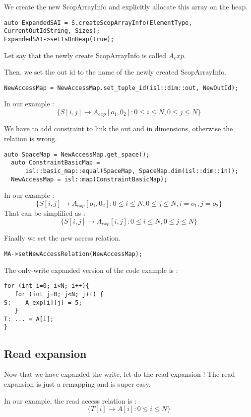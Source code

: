 We create the new ScopArrayInfo and explicitly allocate this array on the heap.

\begin{lstlisting}[frame=single]
auto ExpandedSAI = S.createScopArrayInfo(ElementType, CurrentOutIdString, Sizes);
ExpandedSAI->setIsOnHeap(true);
\end{lstlisting}
Let say that the newly create ScopArrayInfo is called $A_exp$.

Then, we set the out id to the name of the newly created ScopArrayInfo.
\begin{lstlisting}[frame=single]
NewAccessMap = NewAccessMap.set_tuple_id(isl::dim::out, NewOutId);
\end{lstlisting}
In our example :
\[
\{ S[i, j] \rightarrow A_{exp}[o_1, 0_2] : 0 \le i \le N, 0 \le j \le N\}
\]

We have to add constraint to link the out and in dimensions, otherwise the relation is wrong.
\begin{lstlisting}[frame=single]
auto SpaceMap = NewAccessMap.get_space();
  auto ConstraintBasicMap =
      isl::basic_map::equal(SpaceMap, SpaceMap.dim(isl::dim::in));
  NewAccessMap = isl::map(ConstraintBasicMap);
\end{lstlisting}
In our example :
\[
\{ S[i, j] \rightarrow A_{exp}[o_1, 0_2] : 0 \le i \le N, 0 \le j \le N, i=o_1, j=o_2\}
\]
That can be simplified as :
\[
\{ S[i, j] \rightarrow A_{exp}[i, j] : 0 \le i \le N, 0 \le j \le N\}
\]

Finally we set the new access relation.
\begin{lstlisting}[frame=single]
MA->setNewAccessRelation(NewAccessMap);
\end{lstlisting}

The only-write expanded version of the code example is :
\begin{lstlisting}[frame=single]
for (int i=0; i<N; i++){
   for (int j=0; j<N; j++) {
S:    A_exp[i][j] = 5;
   }
T: ... = A[i];
}
\end{lstlisting}

\subsection{Read expansion}
Now that we have expanded the write, let do the read expansion ! The read expansion is just a remapping and is super easy.

In our example, the read access relation is :
\[
\{ T[i] \rightarrow A[i] : 0 \le i \le N\}
\]

